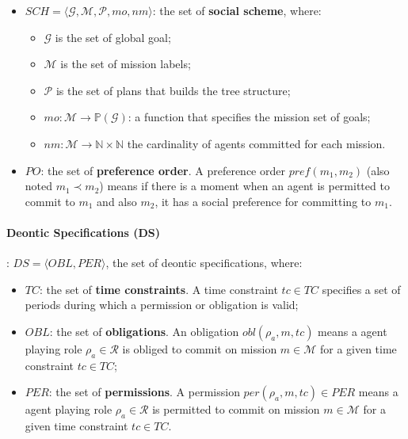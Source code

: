 \documentclass{ecai}
\begin{document}
\begin{itemize}
    \item $SCH = \langle\mathcal{G}, \mathcal{M}, \mathcal{P}, mo, nm \rangle$: the set of \textbf{social scheme}, where:
          \begin{itemize}
              \item $\mathcal{G}$ is the set of global goal;
              \item $\mathcal{M}$ is the set of mission labels;
              \item $\mathcal{P}$ is the set of plans that builds the tree structure;
              \item $mo: \mathcal{M} \rightarrow \mathbb{P}(\mathcal{G})$: a function that specifies the mission set of goals;
              \item $nm: \mathcal{M} \rightarrow \mathbb{N} \times \mathbb{N}$ the cardinality of agents committed for each mission.
          \end{itemize}
    \item $PO$: the set of \textbf{preference order}. A preference order $pref(m_1, m_2)$ (also noted $m_{1} \prec m_{2}$) means if there is a moment when an agent is permitted to commit to $m_{1}$ and also $m_{2}$, it has a social preference for committing to $m_{1}$.
\end{itemize}

\paragraph{\textbf{Deontic Specifications (DS)}}: $DS = \langle OBL,PER \rangle$, the set of deontic specifications, where:

\begin{itemize}
    \item $TC$: the set of \textbf{time constraints}. A time constraint $tc \in TC$ specifies a set of periods during which a permission or obligation is valid;
    \item $OBL$: the set of \textbf{obligations}. An obligation $obl(\rho_a,m,tc)$ means a agent playing role $\rho_a \in \mathcal{R}$ is obliged to commit on mission $m \in \mathcal{M}$ for a given time constraint $tc \in TC$;
    \item $PER$: the set of \textbf{permissions}. A permission $per(\rho_a,m,tc) \in PER$ means a agent playing role $\rho_a \in \mathcal{R}$ is permitted to commit on mission $m \in \mathcal{M}$ for a given time constraint $tc \in TC$.
\end{itemize}
\end{document}
